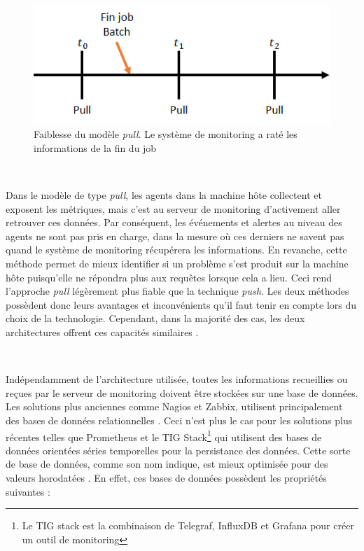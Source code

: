 ~

\begin{figure}[ht!]
  \centering
  \includegraphics{img/state_of_the_art/pull_batch_miss.png}
  \caption{Faiblesse du modèle \textit{pull}. Le système de monitoring a raté les informations de la fin du job}
  \label{fig:batch_end}
\end{figure}

~

\noindent
Dans le modèle de type \textit{pull}, les agents dans la machine hôte collectent et exposent les métriques, mais c'est au serveur de monitoring d'activement aller retrouver ces données. Par conséquent, les événements et alertes au niveau des agents ne sont pas pris en charge, dans la mesure où ces derniers ne savent pas quand le système de monitoring récupérera les informations. En revanche, cette méthode permet de mieux identifier si un problème s'est produit sur la machine hôte puisqu'elle ne répondra plus aux requêtes lorsque cela a lieu.\cite{prometheus_doc_pull_push} Ceci rend l'approche \textit{pull} légèrement plus fiable que la technique \textit{push}. Les deux méthodes possèdent donc leurs avantages et inconvénients qu'il faut tenir en compte lors du choix de la technologie. Cependant, dans la majorité des cas, les deux architectures offrent ces capacités similaires \cite{interview_push_pull}.

~

\noindent
Indépendamment de l'architecture utilisée, toutes les informations recueillies ou reçues par le serveur de monitoring doivent être stockées sur une base de données. Les solutions plus anciennes comme Nagios et Zabbix, utilisent principalement des bases de données relationnelles \cite{nagios_db, zabbix_db}. Ceci n'est plus le cas pour les solutions plus récentes telles que Prometheus et le TIG Stack\footnote{Le TIG stack est la combinaison de Telegraf, InfluxDB et Grafana pour créer un outil de monitoring} qui utilisent des bases de données orientées séries temporelles pour la persistance des données. Cette sorte de base de données, comme son nom indique, est mieux optimisée pour des valeurs horodatées \cite{time_series_fr}. En effet, ces bases de données possèdent les propriétés suivantes \cite{alibaba_timeseries}:

